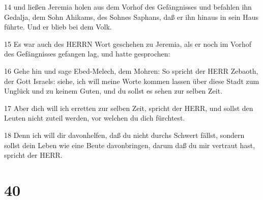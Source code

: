 \par 14 und ließen Jeremia holen aus dem Vorhof des Gefängnisses und befahlen ihn Gedalja, dem Sohn Ahikams, des Sohnes Saphans, daß er ihn hinaus in sein Haus führte. Und er blieb bei dem Volk.
\par 15 Es war auch des HERRN Wort geschehen zu Jeremia, als er noch im Vorhof des Gefängnisses gefangen lag, und hatte gesprochen:
\par 16 Gehe hin und sage Ebed-Melech, dem Mohren: So spricht der HERR Zebaoth, der Gott Israels: siehe, ich will meine Worte kommen lassen über diese Stadt zum Unglück und zu keinem Guten, und du sollst es sehen zur selben Zeit.
\par 17 Aber dich will ich erretten zur selben Zeit, spricht der HERR, und sollst den Leuten nicht zuteil werden, vor welchen du dich fürchtest.
\par 18 Denn ich will dir davonhelfen, daß du nicht durchs Schwert fällst, sondern sollst dein Leben wie eine Beute davonbringen, darum daß du mir vertraut hast, spricht der HERR.

\chapter{40}

